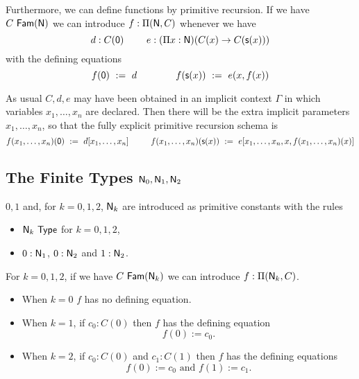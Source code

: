 { Furthermore, we can define functions by primitive recursion.  If we have
$C~{\sf Fam}({\sf N})$ we can introduce $f:\Pi({\sf N},C)$ whenever we have
$$
d:C({\sf 0})~~~~~~~e:(\Pi x:{\sf N})(C(x)\rightarrow C({\sf s} (x)))
$$
with the defining equations
$$
f({\sf 0}) ~:=~ d~~~~~~~~~~~~f({\sf s} (x)) ~:=~ e(x,f(x))
$$
 
As usual $C,d,e$ may have been obtained in an implicit context $\Gamma$ in which variables $x_1,\ldots,x_n$ are declared.  Then there will be the extra implicit parameters $x_1,\ldots,x_n$, so that the fully explicit primitive recursion schema is
$$
f(x_1,\dots,x_n)({\sf 0}) ~:=~ d[x_1,\dots,x_n]~~~~~~~~f(x_1,\dots,x_n)({\sf s} (x)) ~:=~ e[x_1,\dots,x_n,x,f(x_1,\dots,x_n)(x)]
$$

\medskip
\subsection*{The Finite Types ${\sf N}_0,{\sf N}_1,{\sf N}_2$}

$0,1$ and, for $k=0,1,2$, ${\sf N}_k$ are introduced as primitive constants with the rules

\begin{itemize}
\item ${\sf N}_k~{\sf Type}$ for $k=0,1,2$,
\item $0:{\sf N}_1$, $0:{\sf N}_2$ and $1:{\sf N}_2$.
\end{itemize}
 For $k=0,1,2$, if we have $C~{\sf Fam}({\sf N}_k)$ we can introduce $f:\Pi({\sf N}_k,C)$.  
\begin{itemize}
\item When $k=0$ $f$ has no defining equation.  
\item When $k=1$, if $c_0:C(0)$ then $f$ has the defining equation
  \[ f(0):= c_0.\]
\item When $k=2$, if $c_0:C(0)$ and $c_1:C(1)$ then $f$ has the defining equations
  \[ f(0):= c_0\mbox{ and } f(1):=c_1.\]
\end{itemize}
}
